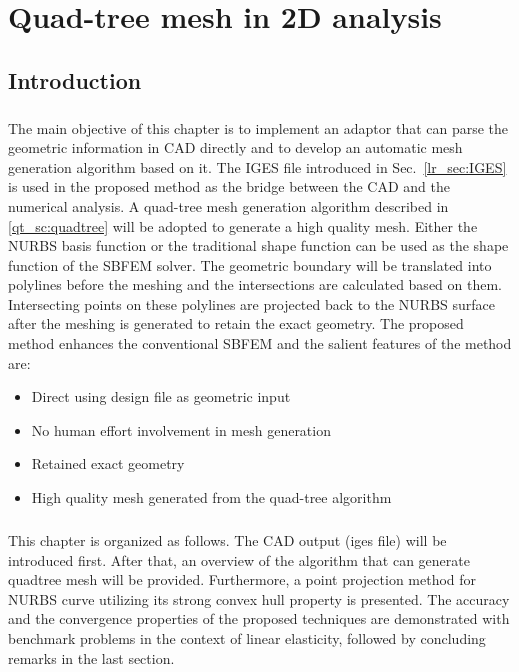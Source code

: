 \chapter{Quad-tree mesh in 2D analysis}
\label{qdt_sec:main}
\section{Introduction}
\paragraph{}
The main objective of this chapter is to implement an adaptor that can parse the geometric information in CAD directly and to develop an automatic mesh generation algorithm based on it.
The IGES file introduced in Sec.~\ref{lr_sec:IGES} is used in the proposed method as the bridge between the CAD and the numerical analysis.
A quad-tree mesh generation algorithm described in \ref{qt_sc:quadtree} will be adopted to generate a high quality mesh.
Either the NURBS basis function or the traditional shape function can be used as the shape function of the SBFEM solver.
The geometric boundary will be translated into polylines before the meshing and the intersections are calculated based on them.
Intersecting points on these polylines are projected back to the NURBS surface after the meshing is generated to retain the exact geometry.
The proposed method enhances the conventional SBFEM and the salient features of the method are:
    \begin{itemize}
        \item Direct using design file as geometric input
        \item No human effort involvement in mesh generation
        \item Retained exact geometry
        \item High quality mesh generated from the quad-tree algorithm
    \end{itemize}
\paragraph{}
This chapter is organized as follows.
The CAD output (iges file) will be introduced first.
After that, an overview of the algorithm that can generate quadtree mesh will be provided.
Furthermore, a point projection method for NURBS curve utilizing its strong convex hull property is presented.
The accuracy and the convergence properties of the proposed techniques are demonstrated with benchmark problems in the context of linear elasticity, followed by concluding remarks in the last section.


